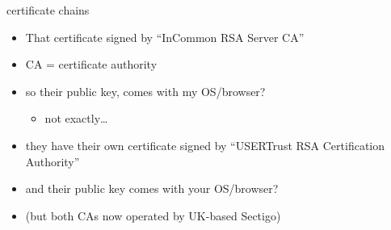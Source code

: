 \begin{frame}{certificate chains}
    \begin{itemize}
    \item That certificate signed by ``InCommon RSA Server CA''
    \item CA = certificate authority
    \vspace{.5cm}
    \item so their public key, comes with my OS/browser?
        \begin{itemize}
        \item not exactly\ldots
        \end{itemize}
    \item they have their own certificate signed by ``USERTrust RSA Certification Authority''
    \item and their public key comes with your OS/browser?
    \vspace{.5cm}
    \item (but both CAs now operated by UK-based Sectigo)
    \end{itemize}
\end{frame}
